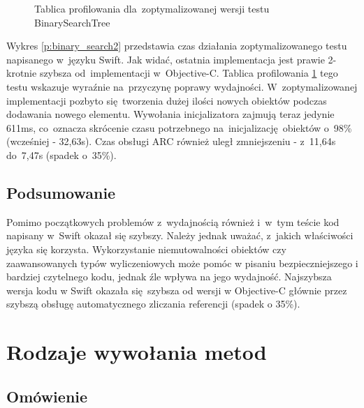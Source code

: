 \documentclass[mgr, shortabstract]{iithesis}
\begin{document}
\begin{figure}
    \caption{Tablica profilowania dla~zoptymalizowanej wersji testu BinarySearchTree}
    \label{i:binary_search2}
\end{figure}

Wykres \ref{p:binary_search2} przedstawia czas działania zoptymalizowanego testu napisanego w~języku Swift. Jak widać, ostatnia implementacja jest prawie 2-krotnie szybsza od~implementacji w~Objective-C. Tablica profilowania \ref{i:binary_search2} tego testu wskazuje wyraźnie na~przyczynę poprawy wydajności. W~zoptymalizowanej implementacji pozbyto się tworzenia dużej ilości nowych obiektów podczas dodawania nowego elementu. Wywołania inicjalizatora zajmują teraz jedynie 611ms, co~oznacza skrócenie czasu potrzebnego na~inicjalizację obiektów o~98\% (wcześniej - 32,63s). Czas obsługi ARC również uległ zmniejszeniu - z~11,64s do~7,47s (spadek o~35\%). 

\subsection{Podsumowanie}

Pomimo początkowych problemów z~wydajnością również i~w~tym teście kod napisany w~Swift okazał się szybszy. Należy jednak uważać, z~jakich właściwości języka się korzysta. Wykorzystanie niemutowalności obiektów czy zaawansowanych typów wyliczeniowych może pomóc w pisaniu bezpieczniejszego i bardziej czytelnego kodu, jednak źle wpływa na jego wydajność. Najszybsza wersja kodu w Swift okazała się szybsza od wersji w Objective-C głównie przez szybszą obsługę automatycznego zliczania referencji (spadek o 35\%).

\section{Rodzaje wywołania metod}
\label{s:wywolania_metod}

\subsection{Omówienie}
\end{document}
